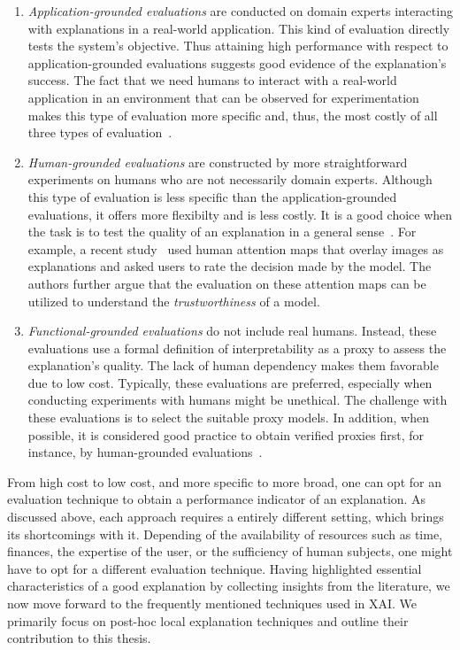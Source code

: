 \begin{enumerate}
    \item \emph{Application-grounded evaluations} are conducted on domain experts interacting with explanations in a real-world application. This kind of evaluation directly tests the system's objective. Thus attaining high performance with respect to application-grounded evaluations suggests good evidence of the explanation's success. The fact that we need humans to interact with a real-world application in an environment that can be observed for experimentation makes this type of evaluation more specific and, thus, the most costly of all three types of evaluation~\parencite{TowardsARigorousScienceML_Velez}.
    \item \emph{Human-grounded evaluations} are constructed by more straightforward experiments on humans who are not necessarily domain experts. Although this type of evaluation is less specific than the application-grounded evaluations, it offers more flexibilty and is less costly. It is a good choice when the task is to test the quality of an explanation in a general sense~\parencite{TowardsARigorousScienceML_Velez}. For example, a recent study~\parencite{AHumanGroundedEvaluationBenchmark_Mohseni} used human attention maps that overlay images as explanations and asked users to rate the decision made by the model. The authors further argue that the evaluation on these attention maps can be utilized to understand the \emph{trustworthiness} of a model.
    \item \emph{Functional-grounded evaluations} do not include real humans. Instead, these evaluations use a formal definition of interpretability as a proxy to assess the explanation's quality. The lack of human dependency makes them favorable due to low cost. Typically, these evaluations are preferred, especially when conducting experiments with humans might be unethical. The challenge with these evaluations is to select the suitable proxy models. In addition, when possible, it is considered good practice to obtain verified proxies first, for instance, by human-grounded evaluations~\parencite{TowardsARigorousScienceML_Velez}.
\end{enumerate}
From high cost to low cost, and more specific to more broad, one can opt for an evaluation technique to obtain a performance indicator of an explanation. As discussed above, each approach requires a entirely different setting, which brings its shortcomings with it. Depending of the availability of resources such as time, finances, the expertise of the user, or the sufficiency of human subjects, one might have to opt for a different evaluation technique. Having highlighted essential characteristics of a good explanation by collecting insights from the literature, we now move forward to the frequently mentioned techniques used in XAI. We primarily focus on post-hoc local explanation techniques and outline their contribution to this thesis.

